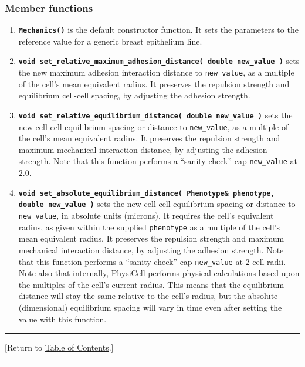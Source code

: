 \documentclass[12pt]{article}
\newcommand{\smallcode}[1]{\textbf{\texttt{#1}}}
\newcommand{\TOClink}{\begin{center}\hrule\vskip-5pt\phantom{.}\hfill[Return to \hyperlink{TOC}{Table of Contents}.]\hfill\phantom{.}\vskip3pt\hrule\end{center}}
\begin{document}
\subsubsection{Member functions}
\begin{enumerate}
\item 
\smallcode{Mechanics()} is the default constructor function. It sets the parameters to the reference value for 
a generic breast epithelium line.  


\item
\smallcode{void set\_relative\_maximum\_adhesion\_distance( double new\_value )} sets the new maximum 
adhesion interaction distance to \texttt{new\_value}, as a multiple of the cell's mean equivalent radius. It 
preserves the repulsion strength and equilibrium cell-cell spacing, by adjusting the adhesion strength. 

\item 
\smallcode{void set\_relative\_equilibrium\_distance( double new\_value )} sets the new cell-cell equilibrium 
spacing or distance to \texttt{new\_value}, as a multiple of the cell's mean equivalent radius. It 
preserves the repulsion strength and maximum mechanical interaction distance, 
by adjusting the adhesion strength. Note that this function performs a ``sanity check'' cap 
\texttt{new\_value} at 2.0. 


\item 
\smallcode{void set\_absolute\_equilibrium\_distance( Phenotype\& phenotype, double new\_value )}
 sets the new cell-cell equilibrium 
spacing or distance to \texttt{new\_value}, in absolute units (microns). It requires the cell's 
equivalent radius, as given within the supplied \texttt{phenotype}
 as a multiple of the cell's mean equivalent radius. It 
preserves the repulsion strength and maximum mechanical interaction distance, 
by adjusting the adhesion strength.  Note that this function performs a ``sanity check'' cap 
\texttt{new\_value} at 2 cell radii. Note also that internally, PhysiCell performs physical calculations 
based upon the multiples of the cell's current radius. This means that the equilibrium distance will 
stay the same relative to the cell's radius, but the absolute (dimensional) equilibrium spacing will 
vary in time even after setting the value with this function. 

\end{enumerate}

\TOClink
\end{document}
